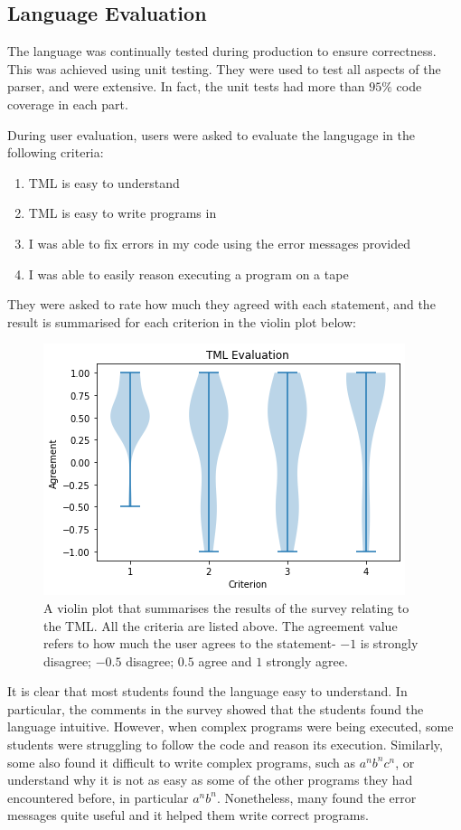
\subsection{Language Evaluation}
The language was continually tested during production to ensure correctness. This was achieved using unit testing. They were used to test all aspects of the parser, and were extensive. In fact, the unit tests had more than $95\%$ code coverage in each part.

During user evaluation, users were asked to evaluate the langugage in the following criteria:
\begin{enumerate}
    \item TML is easy to understand
    \item TML is easy to write programs in
    \item I was able to fix errors in my code using the error messages provided
    \item I was able to easily reason executing a program on a tape
\end{enumerate}
They were asked to rate how much they agreed with each statement, and the result is summarised for each criterion in the violin plot below:
\begin{figure}[H]
    \centering
    \includegraphics[scale=0.75]{data/tml-evaluation.png}
    \caption{A violin plot that summarises the results of the survey relating to the TML. All the criteria are listed above. The agreement value refers to how much the user agrees to the statement- $-1$ is strongly disagree; $-0.5$ disagree; $0.5$ agree and $1$ strongly agree.}
\end{figure}
\noindent It is clear that most students found the language easy to understand. In particular, the comments in the survey showed that the students found the language intuitive. However, when complex programs were being executed, some students were struggling to follow the code and reason its execution. Similarly, some also found it difficult to write complex programs, such as $a^n b^n c^n$, or understand why it is not as easy as some of the other programs they had encountered before, in particular $a^n b^n$. Nonetheless, many found the error messages quite useful and it helped them write correct programs. 

